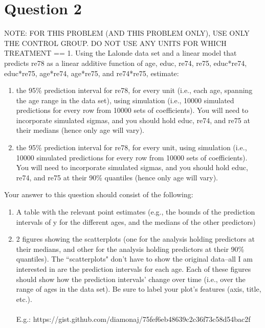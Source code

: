 \documentclass[11pt, oneside]{article}
\begin{document}
\section*{Question 2} NOTE: FOR THIS PROBLEM (AND THIS PROBLEM ONLY), USE ONLY THE CONTROL GROUP. DO NOT USE ANY UNITS FOR WHICH TREATMENT == 1.
Using the Lalonde data set and a linear model that predicts re78 as a linear additive function of age, educ, re74, re75, educ*re74, educ*re75, age*re74, age*re75, and re74*re75, estimate:
\begin{enumerate}
	\item the 95\% prediction interval for re78, for every unit (i.e., each age, spanning the age range in the data set), using simulation (i.e., 10000 simulated predictions for every row from 10000 sets of coefficients). You will need to incorporate simulated sigmas, and you should hold educ, re74, and re75 at their medians (hence only age will vary). 
	\item the 95\% prediction interval for re78, for every unit, using simulation (i.e., 10000 simulated predictions for every row from 10000 sets of coefficients). You will need to incorporate simulated sigmas, and you should hold educ, re74, and re75 at their 90\% quantiles (hence only age will vary).
\end{enumerate}
Your answer to this question should consist of the following:


\begin{enumerate}[label=(\alph*)]
	\item A table with the relevant point estimates (e.g., the bounds of the prediction intervals of y for the different ages, and the medians of the other predictors)
	\item 2 figures showing the scatterplots (one for the analysis holding predictors at their medians, and other for the analysis holding predictors at their 90\% quantiles). The ``scatterplots" don't have to show the original data--all I am interested in are the prediction intervals for each age. Each of these figures should show how the prediction intervals' change over time (i.e., over the range of ages in the data set). Be sure to label your plot's features (axis, title, etc.). \\ \\ E.g.: https://gist.github.com/diamonaj/75fef6eb48639c2c36f73c58d54bac2f
\end{enumerate}
\end{document}
